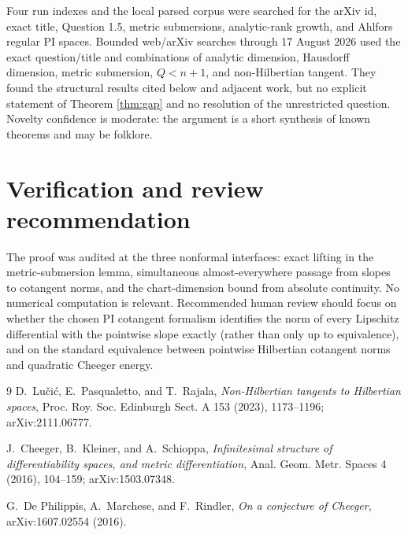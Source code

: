\documentclass[11pt]{article}
\begin{document}
Four run indexes and the local parsed corpus were searched for the arXiv id,
exact title, Question 1.5, metric submersions, analytic-rank growth, and
Ahlfors regular PI spaces. Bounded web/arXiv searches through 17 August 2026
used the exact question/title and combinations of analytic dimension,
Hausdorff dimension, metric submersion, \(Q<n+1\), and non-Hilbertian tangent.
They found the structural results cited below and adjacent work, but no
explicit statement of Theorem \ref{thm:gap} and no resolution of the
unrestricted question. Novelty confidence is moderate: the argument is a
short synthesis of known theorems and may be folklore.

\section*{Verification and review recommendation}

The proof was audited at the three nonformal interfaces: exact lifting in the
metric-submersion lemma, simultaneous almost-everywhere passage from slopes to
cotangent norms, and the chart-dimension bound from absolute continuity. No
numerical computation is relevant. Recommended human review should focus on
whether the chosen PI cotangent formalism identifies the norm of every
Lipschitz differential with the pointwise slope exactly (rather than only up
to equivalence), and on the standard equivalence between pointwise Hilbertian
cotangent norms and quadratic Cheeger energy.

\small
\begin{thebibliography}{9}
D.~Lu\v{c}i\'c, E.~Pasqualetto, and T.~Rajala,
\emph{Non-Hilbertian tangents to Hilbertian spaces},
Proc. Roy. Soc. Edinburgh Sect. A 153 (2023), 1173--1196;
arXiv:2111.06777.

J.~Cheeger, B.~Kleiner, and A.~Schioppa,
\emph{Infinitesimal structure of differentiability spaces, and metric
differentiation}, Anal. Geom. Metr. Spaces 4 (2016), 104--159;
arXiv:1503.07348.

G.~De Philippis, A.~Marchese, and F.~Rindler,
\emph{On a conjecture of Cheeger},
arXiv:1607.02554 (2016).
\end{thebibliography}
\end{document}
